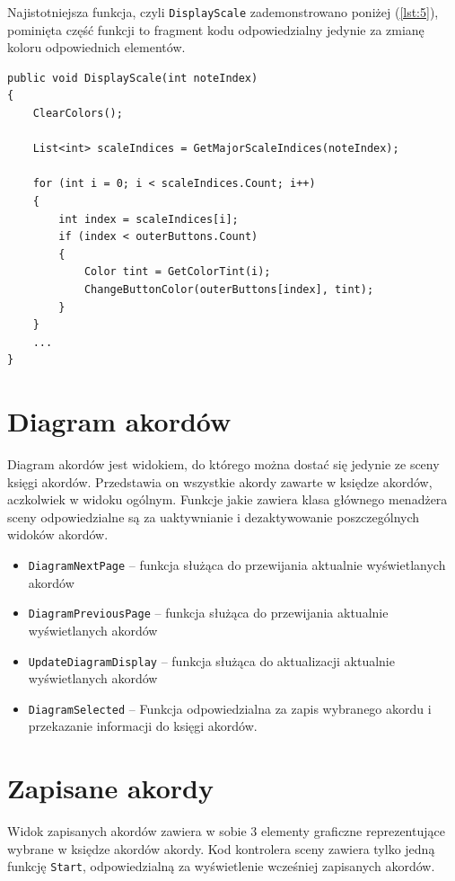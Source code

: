 Najistotniejsza funkcja, czyli \texttt{DisplayScale} zademonstrowano poniżej (\ref{lst:5}), pominięta część funkcji to fragment kodu odpowiedzialny jedynie za zmianę koloru odpowiednich elementów.

\begin{lstlisting}[style=sharpcstyle,caption=Funkcja \texttt{DisplayScale}, label=lst:5]
public void DisplayScale(int noteIndex)
{
    ClearColors();

    List<int> scaleIndices = GetMajorScaleIndices(noteIndex);

    for (int i = 0; i < scaleIndices.Count; i++)
    {
        int index = scaleIndices[i];
        if (index < outerButtons.Count)
        {
            Color tint = GetColorTint(i);
            ChangeButtonColor(outerButtons[index], tint);
        }
    }
    ...         
}
\end{lstlisting}

\section{Diagram akordów}

Diagram akordów jest widokiem, do którego można dostać się jedynie ze sceny księgi akordów. Przedstawia on wszystkie akordy zawarte w księdze akordów, aczkolwiek w widoku ogólnym. Funkcje jakie zawiera klasa głównego menadżera sceny odpowiedzialne są za uaktywnianie i dezaktywowanie poszczególnych widoków akordów.

\begin{itemize}
    \item \texttt{DiagramNextPage} -- funkcja służąca do przewijania aktualnie wyświetlanych akordów
    \item \texttt{DiagramPreviousPage} -- funkcja służąca do przewijania aktualnie wyświetlanych akordów
    \item \texttt{UpdateDiagramDisplay} -- funkcja służąca do aktualizacji aktualnie wyświetlanych akordów
    \item \texttt{DiagramSelected} -- Funkcja odpowiedzialna za zapis wybranego akordu i przekazanie informacji do księgi akordów.
\end{itemize}

\section{Zapisane akordy}

Widok zapisanych akordów zawiera w sobie 3 elementy graficzne reprezentujące wybrane w księdze akordów akordy. Kod kontrolera sceny zawiera tylko jedną funkcję \texttt{Start}, odpowiedzialną za wyświetlenie wcześniej zapisanych akordów.